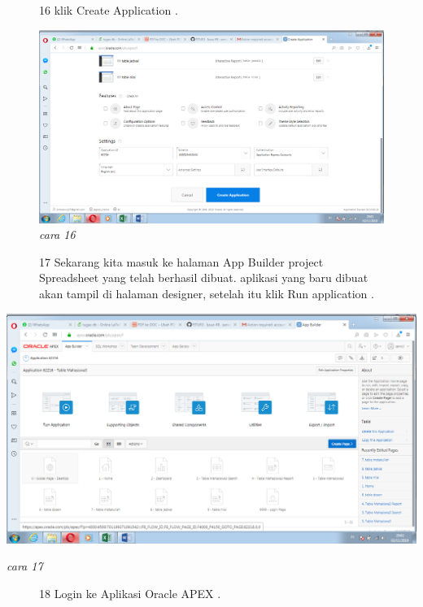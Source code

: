 \begin{enumerate}
\begin{figure}
\item[16] klik Create Application .
\begin{center}
\includegraphics[scale=0.2]{apex/db10.png}
    \caption{\textit{cara 16}}
        \end{center}
\label{gambar}
\end{figure}


\begin{figure}
\item[17]Sekarang kita masuk ke halaman App Builder project Spreadsheet yang telah berhasil dibuat. aplikasi yang baru dibuat akan tampil di halaman designer, setelah itu klik Run application .
\end{figure}
\begin{center}
\includegraphics[scale=0.2]{apex/db11.png}
    \caption{\textit{cara 17}}
        \end{center}
\label{gambar}
\begin{figure}
\item[18]Login ke Aplikasi Oracle APEX .


\end{figure}
\end{enumerate}
